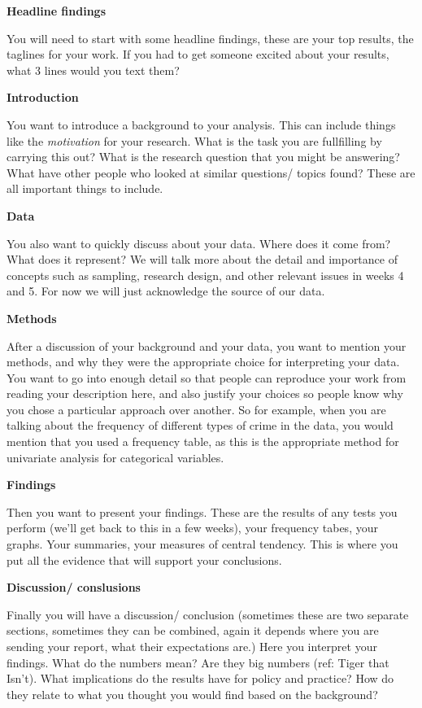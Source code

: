 \documentclass[
]{book}
\begin{document}
\textbf{Headline findings}

You will need to start with some headline findings, these are your top results, the taglines for your work. If you had to get someone excited about your results, what 3 lines would you text them?

\textbf{Introduction}

You want to introduce a background to your analysis. This can include things like the \emph{motivation} for your research. What is the task you are fullfilling by carrying this out? What is the research question that you might be answering? What have other people who looked at similar questions/ topics found? These are all important things to include.

\textbf{Data}

You also want to quickly discuss about your data. Where does it come from? What does it represent? We will talk more about the detail and importance of concepts such as sampling, research design, and other relevant issues in weeks 4 and 5. For now we will just acknowledge the source of our data.

\textbf{Methods}

After a discussion of your background and your data, you want to mention your methods, and why they were the appropriate choice for interpreting your data. You want to go into enough detail so that people can reproduce your work from reading your description here, and also justify your choices so people know why you chose a particular approach over another. So for example, when you are talking about the frequency of different types of crime in the data, you would mention that you used a frequency table, as this is the appropriate method for univariate analysis for categorical variables.

\textbf{Findings}

Then you want to present your findings. These are the results of any tests you perform (we'll get back to this in a few weeks), your frequency tabes, your graphs. Your summaries, your measures of central tendency. This is where you put all the evidence that will support your conclusions.

\textbf{Discussion/ conslusions}

Finally you will have a discussion/ conclusion (sometimes these are two separate sections, sometimes they can be combined, again it depends where you are sending your report, what their expectations are.) Here you interpret your findings. What do the numbers mean? Are they big numbers (ref: Tiger that Isn't). What implications do the results have for policy and practice? How do they relate to what you thought you would find based on the background?
\end{document}
